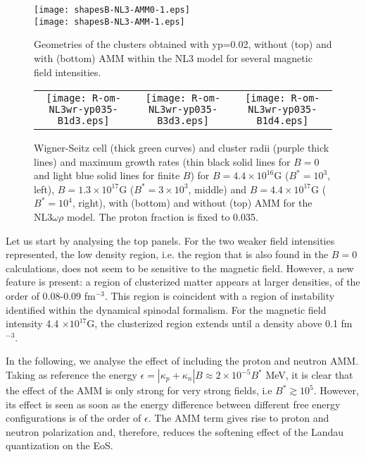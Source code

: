 \documentclass[epj]{svjour}
\begin{document}
\begin{figure}[htp]
  \texttt{[image: shapesB-NL3-AMM0-1.eps]} \\
  \texttt{[image: shapesB-NL3-AMM-1.eps]} \\
  \caption{Geometries of the clusters obtained with  yp=0.02, without
    (top) and with (bottom)
    AMM within the NL3 model for
    several magnetic field intensities.} 
\label{shapesNL3}
\end{figure}


\begin{figure*}[htp]
  \begin{tabular}{ccc}
    \texttt{[image: R-om-NL3wr-yp035-B1d3.eps]} &                                                                       
   \texttt{[image: R-om-NL3wr-yp035-B3d3.eps]} &
  \texttt{[image: R-om-NL3wr-yp035-B1d4.eps]} \\ 
  \end{tabular}
\caption{Wigner-Seitz cell (thick green curves) and cluster radii
  (purple thick lines) and maximum growth rates (thin black solid lines for $B=0$ and light blue solid lines for finite $B$) for  $B=4.4\times 10^{16}$G ($B^*= 10^{3}$, left),
  $B=1.3\times 10^{17}$G    ($B^*=3\times 10^{3}$, middle) and
   $B=4.4\times 10^{17}$G ($B^*= 10^{4}$, right), with (bottom) and without (top) AMM for the
  NL3$\omega\rho$ model. The proton fraction is fixed to 0.035.}
\label{nl3wr}
\end{figure*}




 Let us start by analysing the top panels. For the two weaker field intensities
represented, the low density region, i.e. the region that is also found in the $B=0$ calculations, does not seem to be sensitive to
the magnetic field. However, a new feature is present: a region of clusterized matter appears 
at larger densities, of the order of  0.08-0.09
fm$^{-3}$.
 This region is coincident with a region of instability identified
within the dynamical spinodal formalism.
For the magnetic  field intensity 4.4
$\times 10^{17}$G, the clusterized region extends until a density
above 0.1 fm$^{-3}$. 

In the following, we analyse the effect of including the proton and
  neutron AMM.  Taking as reference the energy
  $\epsilon=|\kappa_p+\kappa_n|B \approx 2\times 10^{-5}B^*$ MeV,
it is clear that the effect of the AMM is only strong for very strong
fields, i.e $B^*\gtrsim 10^5$. However, its
effect is seen as soon as the energy difference between different free
energy configurations is of the order of $\epsilon$.  The AMM term
gives rise to proton and neutron polarization and, therefore, 
reduces the softening  effect of the Landau
quantization on the EoS. 
  
\end{document}
